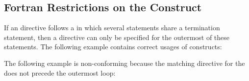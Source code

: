 \pagebreak
\begin{fortranspecific}[4ex]
\section{Fortran Restrictions on the  Construct}
\label{sec:fort_do}

If an  directive follows a  in which several 
 statements share a  termination statement, then a   
directive can only be specified for the outermost of these  statements. 
The following example contains correct usages of 
 constructs:


The following example is non-conforming because the matching  directive 
for the  does not precede the outermost loop:

\end{fortranspecific}


